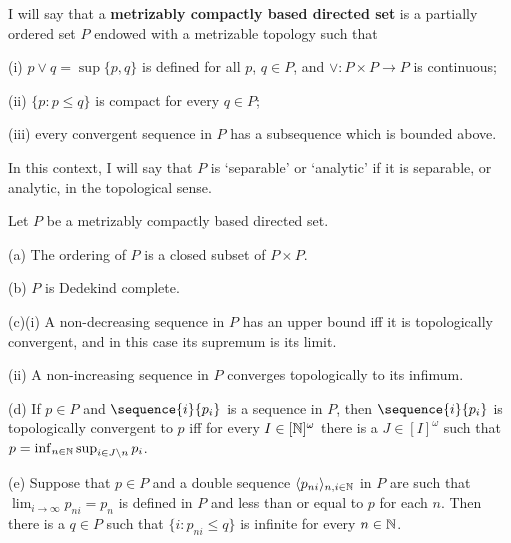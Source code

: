  I will say that a {\bf metrizably compactly
based directed set} is a partially ordered set $P$ endowed with a
metrizable topology such that

(i) $p\vee q=\sup\{p,q\}$ is defined for all $p$, $q\in P$, and
$\vee:P\times P\to P$ is continuous;

(ii) $\{p:p\le q\}$ is compact for every $q\in P$;

(iii) every convergent sequence in $P$ has a subsequence which is bounded
above.

\noindent In this context, I will say that $P$ is `separable' or
`analytic' if it is separable, or analytic, in the topological sense.


 Let $P$ be a metrizably
compactly based directed set.

(a) The ordering of $P$ is a closed subset of $P\times P$.

(b) $P$ is Dedekind complete.

(c)(i) A non-decreasing sequence in $P$ has an upper bound iff it is
topologically convergent, and in this case its supremum is its limit.

\quad(ii) A non-increasing sequence in $P$ converges topologically
to its infimum.

(d) If $p\in P$ and $\sequence{i}{p_i}$ is a sequence in $P$, then
$\sequence{i}{p_i}$ is topologically convergent to $p$ iff for every
$I\in[\Bbb N]^{\omega}$ there is a $J\in[I]^{\omega}$ such that
$p=\inf_{n\in\Bbb N}\sup_{i\in J\setminus n}p_i$.

(e) Suppose that $p\in P$ and a double sequence
$\langle p_{ni}\rangle_{n,i\in\Bbb N}$ in $P$ are such that
$\lim_{i\to\infty}p_{ni}=p_n$ is defined in $P$ and less than or equal
to $p$ for each $n$.   Then there is a $q\in P$ such that
$\{i:p_{ni}\le q\}$ is infinite for every $n\in\Bbb N$.

